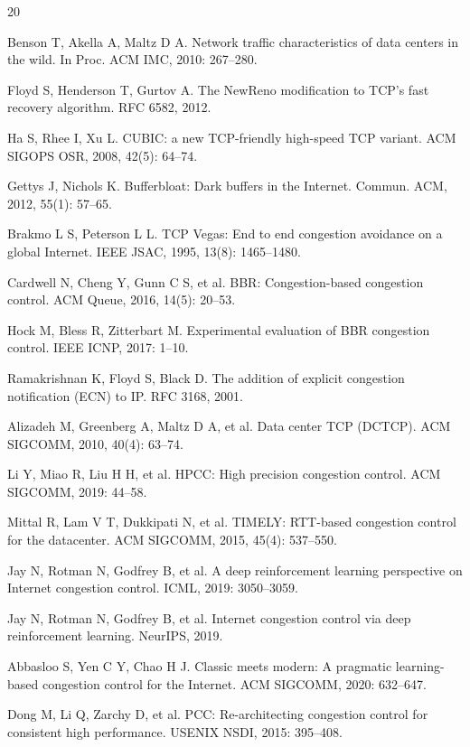 \documentclass[10pt,twocolumn]{article}
\begin{document}
{\small
\begin{thebibliography}{20}

Benson T, Akella A, Maltz D A. Network traffic characteristics of data centers in the wild. In Proc. ACM IMC, 2010: 267--280.

Floyd S, Henderson T, Gurtov A. The NewReno modification to TCP's fast recovery algorithm. RFC 6582, 2012.

Ha S, Rhee I, Xu L. CUBIC: a new TCP-friendly high-speed TCP variant. ACM SIGOPS OSR, 2008, 42(5): 64--74.

Gettys J, Nichols K. Bufferbloat: Dark buffers in the Internet. Commun. ACM, 2012, 55(1): 57--65.

Brakmo L S, Peterson L L. TCP Vegas: End to end congestion avoidance on a global Internet. IEEE JSAC, 1995, 13(8): 1465--1480.

Cardwell N, Cheng Y, Gunn C S, et al. BBR: Congestion-based congestion control. ACM Queue, 2016, 14(5): 20--53.

Hock M, Bless R, Zitterbart M. Experimental evaluation of BBR congestion control. IEEE ICNP, 2017: 1--10.

Ramakrishnan K, Floyd S, Black D. The addition of explicit congestion notification (ECN) to IP. RFC 3168, 2001.

Alizadeh M, Greenberg A, Maltz D A, et al. Data center TCP (DCTCP). ACM SIGCOMM, 2010, 40(4): 63--74.

Li Y, Miao R, Liu H H, et al. HPCC: High precision congestion control. ACM SIGCOMM, 2019: 44--58.

Mittal R, Lam V T, Dukkipati N, et al. TIMELY: RTT-based congestion control for the datacenter. ACM SIGCOMM, 2015, 45(4): 537--550.

Jay N, Rotman N, Godfrey B, et al. A deep reinforcement learning perspective on Internet congestion control. ICML, 2019: 3050--3059.

Jay N, Rotman N, Godfrey B, et al. Internet congestion control via deep reinforcement learning. NeurIPS, 2019.

Abbasloo S, Yen C Y, Chao H J. Classic meets modern: A pragmatic learning-based congestion control for the Internet. ACM SIGCOMM, 2020: 632--647.

Dong M, Li Q, Zarchy D, et al. PCC: Re-architecting congestion control for consistent high performance. USENIX NSDI, 2015: 395--408.


\end{thebibliography}}
\end{document}
